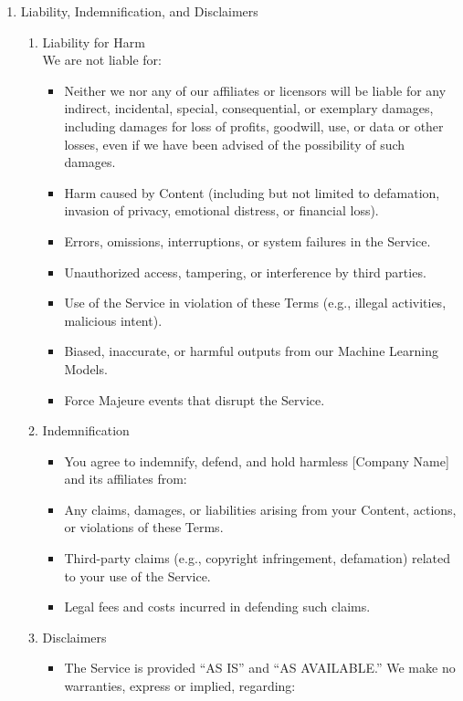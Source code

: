 \documentclass{standalone}
\begin{document}
\begin{enumerate}[label=\arabic*., noitemsep,leftmargin=*]
		\item Liability, Indemnification, and Disclaimers
		\begin{enumerate}[label*=\arabic*., noitemsep,leftmargin=*]
			\item Liability for Harm\\
			We are not liable for:
			\begin{itemize}[noitemsep,leftmargin=*]
				\item [-] Neither we nor any of our affiliates or licensors will be liable for any indirect, incidental, special, consequential, or exemplary damages, including damages for loss of profits, goodwill, use, or data or other losses, even if we have been advised of the possibility of such damages. 
				\item [-] Harm caused by Content (including but not limited to defamation, invasion of privacy, emotional distress, or financial loss).
				\item [-] Errors, omissions, interruptions, or system failures in the Service.
				\item [-] Unauthorized access, tampering, or interference by third parties.
				\item [-] Use of the Service in violation of these Terms (e.g., illegal activities, malicious intent).
				\item [-] Biased, inaccurate, or harmful outputs from our Machine Learning Models.
				\item [-] Force Majeure events that disrupt the Service.
			\end{itemize}
			\item Indemnification
			\begin{itemize}[noitemsep,leftmargin=*]
				\item [-] You agree to indemnify, defend, and hold harmless [Company Name] and its affiliates from:
				\item [-] Any claims, damages, or liabilities arising from your Content, actions, or violations of these Terms.
				\item [-] Third-party claims (e.g., copyright infringement, defamation) related to your use of the Service.
				\item [-] Legal fees and costs incurred in defending such claims.
			\end{itemize}
			\item Disclaimers
			\begin{itemize}[noitemsep,leftmargin=*]
				\item [-] The Service is provided “AS IS” and “AS AVAILABLE.” We make no warranties, express or implied, regarding:

\end{itemize}
\end{enumerate}
\end{enumerate}
\end{document}
